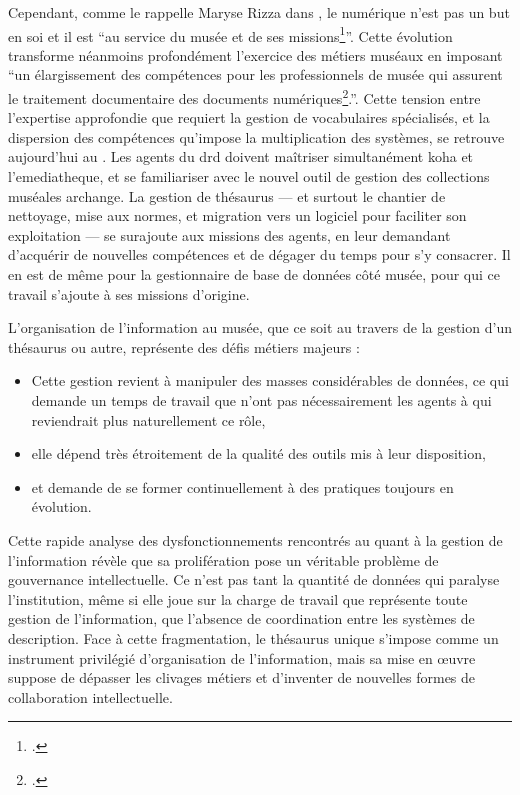 Cependant, comme le rappelle Maryse Rizza dans , le numérique n’est pas un but en soi et il est \enquote{au service du musée et de ses missions\footcite{ricardRGPDArchives2018a}}. Cette évolution transforme néanmoins profondément l’exercice des métiers muséaux en imposant \enquote{un élargissement des compétences pour les professionnels de musée qui assurent le traitement documentaire des documents numériques\footcite{rizzaDocumentAuCoeur2014}.}. Cette tension entre l’expertise approfondie que requiert la gestion de vocabulaires spécialisés, et la dispersion des compétences qu’impose la multiplication des systèmes, se retrouve aujourd’hui au \mae. Les agents du \ac{drd} doivent maîtriser simultanément \gls{koha} et l’\gls{emediatheque}, et se familiariser avec le nouvel outil de gestion des collections muséales \gls{archange}. La gestion de thésaurus — et surtout le chantier de nettoyage, mise aux normes, et migration vers un logiciel pour faciliter son exploitation — se surajoute aux missions des agents, en leur demandant d’acquérir de nouvelles compétences et de dégager du temps pour s’y consacrer. Il en est de même pour la gestionnaire de base de données côté musée, pour qui ce travail s’ajoute à ses missions d’origine.

L’organisation de l’information au musée, que ce soit au travers de la gestion d’un thésaurus ou autre, représente des défis métiers majeurs :
\begin{itemize}
	\item Cette gestion revient à manipuler des masses considérables de données, ce qui demande un temps de travail que n’ont pas nécessairement les agents à qui reviendrait plus naturellement ce rôle,
	\item elle dépend très étroitement de la qualité des outils mis à leur disposition,
	\item et demande de se former continuellement à des pratiques toujours en évolution.
\end{itemize}

\bigskip
\bigskip
\bigskip

Cette rapide analyse des dysfonctionnements rencontrés au \mae quant à la gestion de l'information révèle que sa prolifération pose un véritable problème de gouvernance intellectuelle. Ce n’est pas tant la quantité de données qui paralyse l’institution, même si elle joue sur la charge de travail que représente toute gestion de l'information, que l’absence de coordination entre les systèmes de description. Face à cette fragmentation, le thésaurus unique s’impose comme un instrument privilégié d’organisation de l’information, mais sa mise en œuvre suppose de dépasser les clivages métiers et d’inventer de nouvelles formes de collaboration intellectuelle.